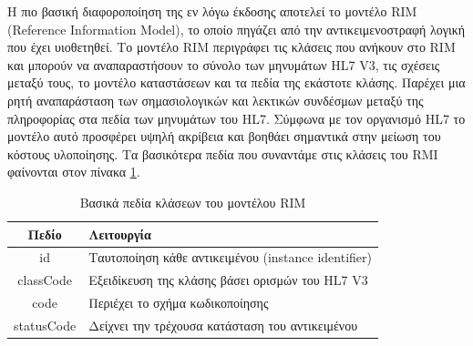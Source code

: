 		Η πιο βασική διαφοροποίηση της εν λόγω έκδοσης αποτελεί το μοντέλο RIM (Reference Information Model), το οποίο πηγάζει από την αντικειμενοστραφή λογική που έχει υιοθετηθεί\cite{HL7RIM}. Το μοντέλο RIM περιγράφει τις κλάσεις που ανήκουν στο RIM και μπορούν να αναπαραστήσουν το σύνολο των μηνυμάτων HL7 V3, τις σχέσεις μεταξύ τους, το μοντέλο καταστάσεων και τα πεδία της εκάστοτε κλάσης. Παρέχει μια ρητή αναπαράσταση των σημασιολογικών και λεκτικών συνδέσμων μεταξύ της πληροφορίας στα πεδία των μηνυμάτων του HL7. Σύμφωνα με τον οργανισμό HL7 το μοντέλο αυτό προσφέρει υψηλή ακρίβεια και βοηθάει σημαντικά στην μείωση του κόστους υλοποίησης. Τα βασικότερα πεδία που συναντάμε στις κλάσεις του RMI φαίνονται στον πίνακα \ref{tab:HL7_V3_RMI_fields}.
	\begin{table}[h]
		\begin{center}
		    \begin{tabular}{|c|l|}
		    \hline
		    \rowcolor{grayy}
		    \textbf{Πεδίο} & \textbf{Λειτουργία}
		    \\ \hline
		     id & Ταυτοποίηση κάθε αντικειμένου (instance identifier)
		     \\ \hline
		     classCode & Εξειδίκευση της κλάσης βάσει ορισμών του HL7 V3
		     \\ \hline
		     code & Περιέχει το σχήμα κωδικοποίησης
		     \\ \hline
		     statusCode & Δείχνει την τρέχουσα κατάσταση του αντικειμένου
		     \\ \hline
		    \end{tabular}
		    \caption{Βασικά πεδία κλάσεων του μοντέλου RIM}
			\label{tab:HL7_V3_RMI_fields}
		\end{center}
	\end{table}
	
